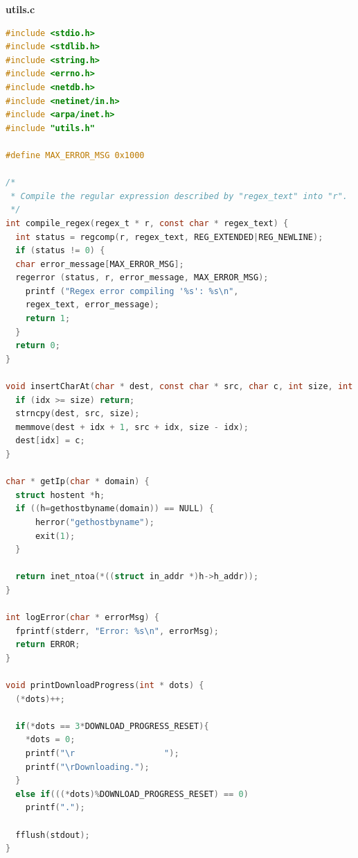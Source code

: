 \documentclass[a4paper, 11pt]{article}
\begin{document}
\huge\textbf{utils.c}
\begin{lstlisting}[language=C]
#include <stdio.h>
#include <stdlib.h>
#include <string.h>
#include <errno.h>
#include <netdb.h>
#include <netinet/in.h>
#include <arpa/inet.h>
#include "utils.h"

#define MAX_ERROR_MSG 0x1000

/*
 * Compile the regular expression described by "regex_text" into "r".
 */
int compile_regex(regex_t * r, const char * regex_text) {
  int status = regcomp(r, regex_text, REG_EXTENDED|REG_NEWLINE);
  if (status != 0) {
  char error_message[MAX_ERROR_MSG];
  regerror (status, r, error_message, MAX_ERROR_MSG);
    printf ("Regex error compiling '%s': %s\n",
    regex_text, error_message);
    return 1;
  }
  return 0;
}

void insertCharAt(char * dest, const char * src, char c, int size, int idx) {
  if (idx >= size) return;
  strncpy(dest, src, size);
  memmove(dest + idx + 1, src + idx, size - idx);
  dest[idx] = c;
}

char * getIp(char * domain) {
  struct hostent *h;
  if ((h=gethostbyname(domain)) == NULL) {
      herror("gethostbyname");
      exit(1);
  }
  
  return inet_ntoa(*((struct in_addr *)h->h_addr));
}

int logError(char * errorMsg) {
  fprintf(stderr, "Error: %s\n", errorMsg);
  return ERROR;
}

void printDownloadProgress(int * dots) {
  (*dots)++;

  if(*dots == 3*DOWNLOAD_PROGRESS_RESET){
    *dots = 0;
    printf("\r                  ");
    printf("\rDownloading.");
  }
  else if(((*dots)%DOWNLOAD_PROGRESS_RESET) == 0)
    printf(".");

  fflush(stdout);
}
\end{lstlisting}
\newpage
\end{document}
